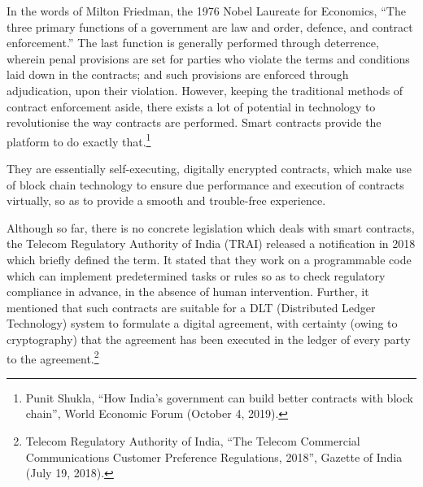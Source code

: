 \setcounter{figure}{0}
\setcounter{table}{0}
\setcounter{footnote}{0}

\label{2021-art6}

\vspace{-.5cm}




\begin{multicols}{2}


\noi
In the words of Milton Friedman, the 1976 Nobel Laureate for Economics, “The three
primary functions of a government are law and order, defence, and contract enforcement.”
The last function is generally performed through deterrence, wherein penal provisions are set
for parties who violate the terms and conditions laid down in the contracts; and such
provisions are enforced through adjudication, upon their violation. However, keeping the
traditional methods of contract enforcement aside, there exists a lot of potential in technology
to revolutionise the way contracts are performed. Smart contracts provide the platform to do
exactly that.\footnote{Punit Shukla, “How India's government can build better contracts with block chain”, World Economic Forum (October 4, 2019).}

\noi
They are essentially self-executing, digitally encrypted contracts, which make use of block
chain technology to ensure due performance and execution of contracts virtually, so as to
provide a smooth and trouble-free experience.

\noi
Although so far, there is no concrete legislation which deals with smart contracts, the
Telecom Regulatory Authority of India (TRAI) released a notification in 2018 which briefly
defined the term. It stated that they work on a programmable code which can implement predetermined tasks or rules so as to check regulatory compliance in advance, in the absence of
human intervention. Further, it mentioned that such contracts are suitable for a DLT
(Distributed Ledger Technology) system to formulate a digital agreement, with certainty
(owing to cryptography) that the agreement has been executed in the ledger of every party to
the agreement.\footnote{Telecom Regulatory Authority of India, “The Telecom Commercial Communications Customer Preference Regulations, 2018”, Gazette of India (July 19, 2018). }


\end{multicols}
